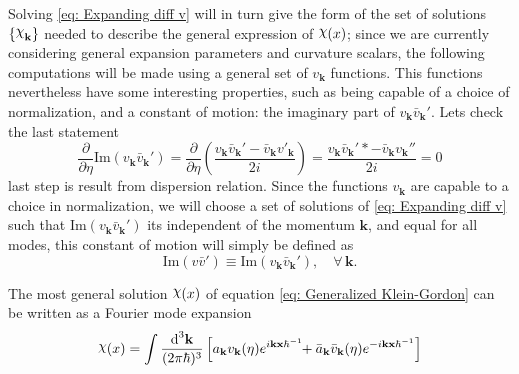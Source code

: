Solving \cref{eq: Expanding diff v} will in turn give the form of the set of solutions $\left\{\rchi_{\mathbf{k}}\right\}$ needed to describe the general expression of $\rchi(x)$; since we are currently considering general expansion parameters and curvature scalars, the following computations will be made using a general set of $v_\mathbf{k}$ functions. This functions nevertheless have some interesting properties, such as being capable of a choice of normalization, and a constant of motion: the imaginary part of $v_\mathbf{k}\bar{v}_\mathbf{k}'$. Lets check the last statement
\begin{equation}
	\frac{\partial}{\partial \eta }\text{Im}(v_\mathbf{k}\bar{v}_\mathbf{k}')=\frac{\partial}{\partial \eta}\left(\frac{v_\mathbf{k}\bar{v}_\mathbf{k}'-\bar v_\mathbf{k}v'_\mathbf{k}}{2i}\right)=\frac{v_\mathbf{k}\bar v_\mathbf{k}'*-\bar v_\mathbf{k}v_\mathbf{k}''}{2i}=0
\end{equation}
last step is result from dispersion relation. Since the functions $v_\mathbf{k}$ are capable to a choice in normalization, we will choose a set of solutions of \cref{eq: Expanding diff v} such that $\text{Im}(v_\mathbf{k}\bar{v}_\mathbf{k}')$ its independent of the momentum $\mathbf{k}$, and equal for all modes, this constant of motion will simply be defined as
\begin{equation}
	\text{Im}(v\bar{v}')\equiv \text{Im}(v_\mathbf{k}\bar{v}_\mathbf{k}'),\quad \forall\,\mathbf{k}.
\end{equation}

The most general solution $\rchi(x)$ of equation \cref{eq: Generalized Klein-Gordon} can be written as a Fourier mode expansion
\begin{equation}
	\rchi(x)=\int\frac{\td^3\mathbf{k}}{(2\pi\hbar)^3}\left[a_\mathbf{k}v_\mathbf{k}(\eta)e^{i\mathbf{kx}\hbar^{-1}}\!\!+\bar a_\mathbf{k}\bar v_\mathbf{k}(\eta)e^{-i\mathbf{kx}\hbar^{-1}}\right]
\end{equation}

